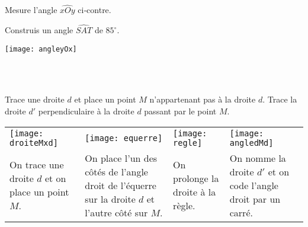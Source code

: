 \begin{methode*1}
\exercice
 \begin{enumerate}
 \begin{minipage}[c]{0.36\textwidth}
  \item Mesure l'angle $\widehat{xOy}$ ci‑contre. 
  \item Construis un angle $\widehat{SAT}$ de $85^\circ$. 
  \end{minipage} \hfill%
 \begin{minipage}[c]{0.56\textwidth}
  \texttt{[image: angleyOx]} 
  \end{minipage} \\
  \end{enumerate}
 
 
\end{methode*1}


\begin{methode*1}

\begin{exemple*1}  \\[0.75em]
Trace une droite $d$ et place un point $M$ n'appartenant pas à la droite $d$. Trace la droite $d'$ perpendiculaire à la droite $d$ passant par le point $M$. \\[0.5em]

\begin{tabularx}{\textwidth}{X|X|X|X}
 \texttt{[image: droiteMxd]} &  \texttt{[image: equerre]} & \texttt{[image: regle]} &  \texttt{[image: angledMd]}\\ 
 On trace une droite $d$ et on place un point $M$. & On place l'un des côtés de l'angle droit de l'équerre sur la droite $d$ et l'autre côté sur $M$.
 & On prolonge la droite à la règle. & On nomme la droite $d'$ et on code l'angle droit par un carré.\\

\end{tabularx} \\
 
 \end{exemple*1}


\exercice %


 
\end{methode*1}

